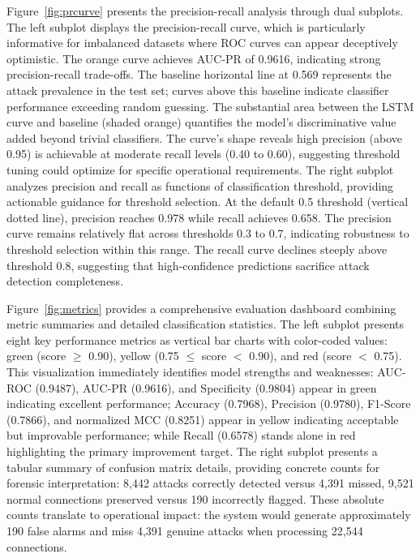 \documentclass[12pt,a4paper]{report}
\begin{document}
Figure~\ref{fig:prcurve} presents the precision-recall analysis through dual subplots. The left subplot displays the precision-recall curve, which is particularly informative for imbalanced datasets where ROC curves can appear deceptively optimistic. The orange curve achieves AUC-PR of 0.9616, indicating strong precision-recall trade-offs. The baseline horizontal line at 0.569 represents the attack prevalence in the test set; curves above this baseline indicate classifier performance exceeding random guessing. The substantial area between the LSTM curve and baseline (shaded orange) quantifies the model's discriminative value added beyond trivial classifiers. The curve's shape reveals high precision (above 0.95) is achievable at moderate recall levels (0.40 to 0.60), suggesting threshold tuning could optimize for specific operational requirements. The right subplot analyzes precision and recall as functions of classification threshold, providing actionable guidance for threshold selection. At the default 0.5 threshold (vertical dotted line), precision reaches 0.978 while recall achieves 0.658. The precision curve remains relatively flat across thresholds 0.3 to 0.7, indicating robustness to threshold selection within this range. The recall curve declines steeply above threshold 0.8, suggesting that high-confidence predictions sacrifice attack detection completeness.

Figure~\ref{fig:metrics} provides a comprehensive evaluation dashboard combining metric summaries and detailed classification statistics. The left subplot presents eight key performance metrics as vertical bar charts with color-coded values: green (score $\geq$ 0.90), yellow (0.75 $\leq$ score $<$ 0.90), and red (score $<$ 0.75). This visualization immediately identifies model strengths and weaknesses: AUC-ROC (0.9487), AUC-PR (0.9616), and Specificity (0.9804) appear in green indicating excellent performance; Accuracy (0.7968), Precision (0.9780), F1-Score (0.7866), and normalized MCC (0.8251) appear in yellow indicating acceptable but improvable performance; while Recall (0.6578) stands alone in red highlighting the primary improvement target. The right subplot presents a tabular summary of confusion matrix details, providing concrete counts for forensic interpretation: 8,442 attacks correctly detected versus 4,391 missed, 9,521 normal connections preserved versus 190 incorrectly flagged. These absolute counts translate to operational impact: the system would generate approximately 190 false alarms and miss 4,391 genuine attacks when processing 22,544 connections.
\end{document}
